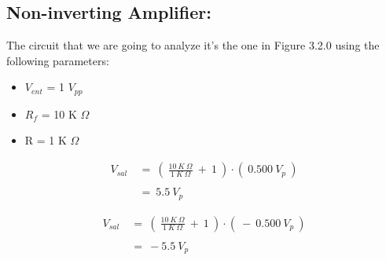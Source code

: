 \subsection{Non-inverting Amplifier:}

The circuit that we are going to analyze it's the one in Figure 3.2.0 using the following parameters: \hfill \break

{\bfseries
\begin{itemize}
\item $V_{ent}$ = 1 $V_{pp}$
\item $R_{f}$ = 10 K $\Omega$
\item R = 1 K $\Omega$
\end{itemize}} \hfill

{\bfseries\itshape{}} 

\begin{flushright}
{\bfseries\itshape{}} \hfill \break
\end{flushright}

\begin{ceqn}
\begin{align*}
V_{sal}\ &=\ (\ \frac{10\ K\ \Omega}{1\ K\ \Omega}\ +\ 1\ ) \cdot (\ 0.500\ V_{p}\ ) \\ \\
&=\ 5.5\ V_{p}
\end{align*}
\end{ceqn} \hfill \break

{\bfseries\itshape{}} 

\begin{flushright}
{\bfseries\itshape{}} \hfill \break
\end{flushright}

\begin{ceqn}
\begin{align*}
V_{sal}\ &=\ (\ \frac{10\ K\ \Omega}{1\ K\ \Omega}\ +\ 1\ ) \cdot (\ -\ 0.500\ V_{p}\ ) \\ \\
&=\ -5.5\ V_{p}
\end{align*}
\end{ceqn} \hfill \break

